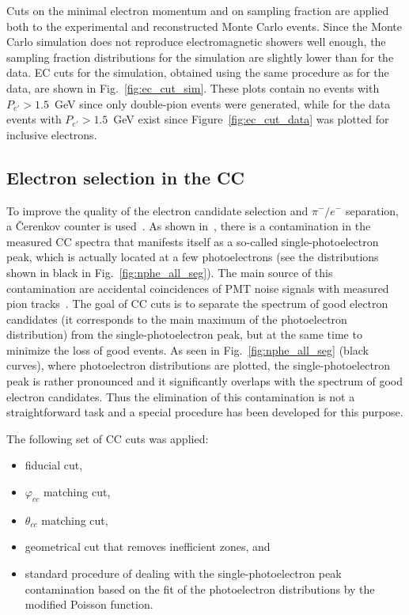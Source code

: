 Cuts on the minimal electron momentum and on sampling fraction are applied both to the experimental and reconstructed Monte Carlo events. Since the Monte Carlo simulation does not reproduce electromagnetic showers well enough, the sampling fraction distributions for the simulation are slightly lower than for the data. EC cuts for the simulation, obtained using the same  procedure as for the data, are shown in Fig.~\ref{fig:ec_cut_sim}. These plots contain no events with $P_{e'} > 1.5$~GeV since only double-pion events were generated, while for the data events with $P_{e'} > 1.5$~GeV exist since Figure~\ref{fig:ec_cut_data} was plotted for inclusive electrons.



\subsection{Electron selection in the CC}
\label{Sect:cc_cuts} 
To improve the quality of the electron candidate selection and $\pi^{-}/e^{-}$ separation, a \v Cerenkov counter is used~\cite{Adams:2001kk}. As shown in~\cite{Osipenko:2004}, there is a contamination in the measured CC spectra that manifests itself as a so-called single-photoelectron peak, which is actually located at a few photoelectrons (see the distributions shown in black in Fig.~\ref{fig:nphe_all_seg}). The main source of this contamination are accidental coincidences of PMT noise signals with measured pion tracks~\cite{Osipenko:2004}. The goal of CC cuts is to separate the spectrum of good electron candidates (it corresponds to the main maximum of the photoelectron distribution) from the single-photoelectron peak, but at the same time to minimize the loss of good events. As seen in Fig.~\ref{fig:nphe_all_seg} (black curves), where photoelectron distributions are plotted, the single-photoelectron peak is rather pronounced and it significantly overlaps with the spectrum of good electron candidates. Thus the elimination of this contamination is not a straightforward task and a special procedure has been developed for this purpose. 

The following set of CC cuts was applied:%
\begin{itemize}
\item fiducial cut,\vspace{-0.5em}
\item $\varphi_{cc}$ matching cut,\vspace{-0.5em}
\item $\theta_{cc}$ matching cut,\vspace{-0.5em}
\item geometrical cut that removes inefficient zones, and\vspace{-0.5em}
\item standard procedure of dealing with the single-photoelectron peak contamination based on the fit of the photoelectron distributions by the modified Poisson function.
\end{itemize}

